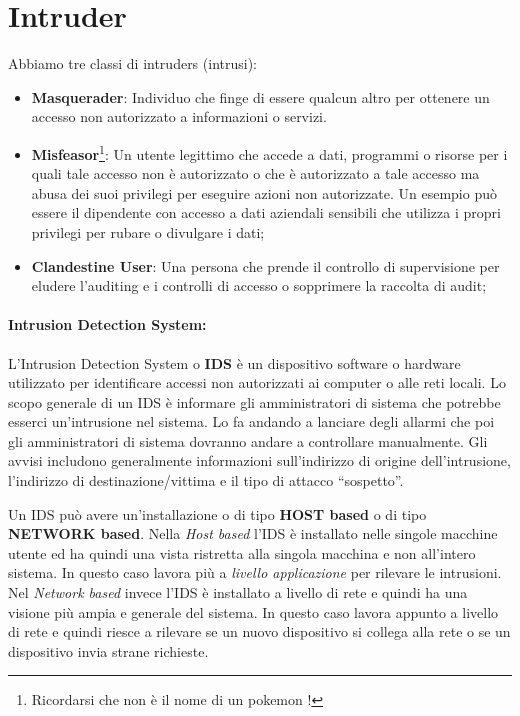 \section{Intruder}

Abbiamo tre classi di intruders (intrusi):

\begin{itemize}
      \item \textbf{Masquerader}: Individuo che finge di essere qualcun altro per ottenere un accesso non autorizzato a informazioni o servizi.
      \item \textbf{Misfeasor}\footnote{Ricordarsi che non è il nome di un pokemon !}: Un utente legittimo che accede a dati, programmi o risorse per i quali tale accesso non è autorizzato o che è autorizzato a tale accesso ma abusa dei suoi privilegi per eseguire azioni non autorizzate. Un esempio può essere il dipendente con accesso a dati aziendali sensibili che utilizza i propri privilegi per rubare o divulgare i dati;
      \item \textbf{Clandestine User}: Una persona che prende il controllo di supervisione per eludere l'auditing e i controlli di accesso o sopprimere la raccolta di audit;
\end{itemize}

\paragraph{Intrusion Detection System: }
L'Intrusion Detection System o \textbf{IDS} è un dispositivo software o hardware utilizzato per identificare accessi non autorizzati ai computer o alle reti locali. Lo scopo generale di un IDS è informare gli amministratori di sistema che potrebbe esserci un'intrusione nel sistema. Lo fa andando a lanciare degli allarmi che poi gli amministratori di sistema dovranno andare a controllare manualmente. Gli avvisi includono generalmente informazioni sull'indirizzo di origine dell'intrusione, l'indirizzo di
destinazione/vittima e il tipo di attacco ``sospetto''.

Un IDS può avere un'installazione o di tipo \textbf{HOST based} o di tipo \textbf{NETWORK based}. Nella \emph{Host based} l'IDS è installato nelle singole macchine utente ed ha quindi una vista ristretta alla singola macchina e non all'intero sistema. In questo caso lavora più a \emph{livello applicazione} per rilevare le intrusioni. Nel \emph{Network based} invece l'IDS è installato a livello di rete e quindi ha una visione più ampia e generale del sistema. In questo caso lavora appunto a livello di rete e quindi riesce a rilevare se un nuovo dispositivo si collega alla rete o se un dispositivo invia strane richieste.

